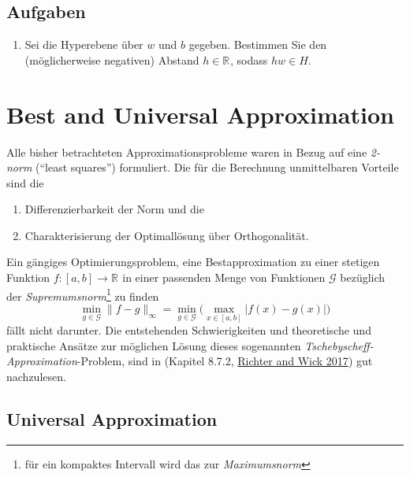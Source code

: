 \documentclass[
]{book}
\providecommand{\tightlist}{%
  \setlength{\itemsep}{0pt}\setlength{\parskip}{0pt}}
\theoremstyle{definition}
\theoremstyle{definition}
\theoremstyle{definition}
\theoremstyle{definition}
\theoremstyle{remark}
\begin{document}
\hypertarget{aufgaben-1}{%
\section{Aufgaben}\label{aufgaben-1}}

\begin{enumerate}
\def\labelenumi{\arabic{enumi}.}
\tightlist
\item
  Sei die Hyperebene über \(w\) und \(b\) gegeben. Bestimmen Sie den
  (möglicherweise negativen) Abstand
  \(h\in \mathbb R^{}\), sodass \(hw\in H\).
\end{enumerate}

\hypertarget{best-and-universal-approximation}{%
\chapter{Best and Universal Approximation}\label{best-and-universal-approximation}}

\def\PLab{\operatorname{PL}[a, b]}
\def\PCab{\operatorname{Pc}[a, b]}
\def\Cab{\mathcal{C}[a, b]}

Alle bisher betrachteten Approximationsprobleme waren in Bezug auf eine \emph{2-norm}
(``least squares'') formuliert. Die für die Berechnung unmittelbaren Vorteile
sind die

\begin{enumerate}
\def\labelenumi{\arabic{enumi}.}
\tightlist
\item
  Differenzierbarkeit der Norm und die
\item
  Charakterisierung der Optimallösung über Orthogonalität.
\end{enumerate}

Ein gängiges Optimierungsproblem, eine Bestapproximation zu einer stetigen
Funktion \(f\colon [a, b]\to \mathbb R^{}\) in einer passenden Menge von Funktionen
\(\mathcal G\) bezüglich der \emph{Supremumsnorm}\footnote{für ein kompaktes
  Intervall wird das zur \emph{Maximumsnorm}} zu finden
\begin{equation*}
\min_{g\in \mathcal G} \|f-g\|_\infty = 
\min_{g \in \mathcal G}\bigl (\max_{x\in [a, b]}|f(x)-g(x)|\bigr )
\end{equation*}
fällt nicht darunter.
Die entstehenden Schwierigkeiten und theoretische und praktische Ansätze
zur möglichen Lösung dieses sogenannten
\emph{Tschebyscheff-Approximation}-Problem, sind in (Kapitel 8.7.2, \protect\hyperlink{ref-RicW17}{Richter and Wick 2017}) gut
nachzulesen.

\hypertarget{universal-approximation}{%
\section{Universal Approximation}\label{universal-approximation}}
\end{document}
